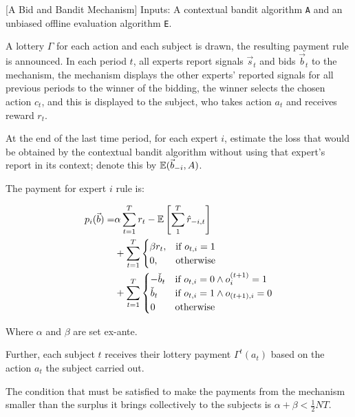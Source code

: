 \begin{mech}\label{mech:bidbandit}[A Bid and Bandit Mechanism]
   Inputs: A contextual bandit algorithm \texttt{A} and an unbiased offline evaluation algorithm \texttt{E}.

A lottery $\Gamma$ for each action and each subject is drawn, the resulting payment rule is announced.
In each period $t$, all experts report signals $\vec s_{t}$ and bids $\vec b_{t}$ to the mechanism, the mechanism displays the other experts' reported signals for all previous periods to the winner of the bidding, the winner selects the chosen action $c_{t}$, and this is displayed to the subject, who takes action $a_{t}$ and receives reward $r_{t}$.

At the end of the last time period, for each expert $i$, estimate the loss that would be obtained by the contextual bandit algorithm without using that expert's report in its context; denote this by $\operatorname*{\mathbb E}(\vec b_{-i},A)$.

The payment for expert $i$ rule is:

   \begin{align}
      p_i(\vec b) =& 
      \alpha \sum_{t=1}^T r_{t} -  \operatorname*{\mathbb E}\left[\sum_1^T \hat{r}_{-i,t}\right]\\
      &+
   \sum_{t=1}^T
\begin{cases}
   \beta r_{t} ,& \text{if } o_{t,i} = 1\\
     0,              & \text{otherwise}
\end{cases}\\
      &+
   \sum_{t=1}^T
\begin{cases}
     - \check b_{t} & \text{if } o_{t,i} = 0 \land o^{(t+1)}_{i} = 1\\
      \check b_{t} & \text{if } o_{t,i}= 1 \land o_{(t+1),i} = 0 \\
		0              & \text{otherwise}
\end{cases}
   \end{align}

Where $\alpha$ and $\beta$ are set ex-ante. 

   Further, each subject $t$ receives their lottery payment $\Gamma^{t}(a_{t})$ based on the action $a_{t}$ the subject carried out.
\end{mech}


The condition that must be satisfied to make the payments from the mechanism smaller than the surplus it brings collectively to the subjects is $ \alpha + \beta < \frac{1}{2}NT$.


